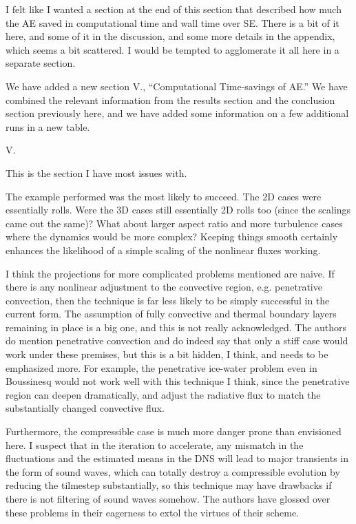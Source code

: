 \documentclass[aps, 11pt, singlecolumn]{revtex4-1} %
\begin{document}
\begin{singlespace}
\begin{myquotation}
I felt like I wanted a section at the end of this section that
described how much the AE saved in computational time and wall time
over SE. There is a bit of it here, and some of it in the discussion,
and some more details in the appendix, which seems a bit scattered. I
would be tempted to agglomerate it all here in a separate section.
\end{myquotation}
We have added a new section V., ``Computational Time-savings of AE.''
We have combined the relevant information from the results section and the 
conclusion section previously here, and we have added some information on a few
additional runs in a new table. 

\begin{myquotation}
V.

This is the section I have most issues with.

The example performed was the most likely to succeed. The 2D cases
were essentially rolls. Were the 3D cases still essentially 2D rolls
too (since the scalings came out the same)? What about larger aspect
ratio and more turbulence cases where the dynamics would be more
complex? Keeping things smooth certainly enhances the likelihood of a
simple scaling of the nonlinear fluxes working.

I think the projections for more complicated problems mentioned are
naive. If there is any nonlinear adjustment to the convective region,
e.g. penetrative convection, then the technique is far less likely to
be simply successful in the current form. The assumption of fully
convective and thermal boundary layers remaining in place is a big
one, and this is not really acknowledged. The authors do mention
penetrative convection and do indeed say that only a stiff case would
work under these premises, but this is a bit hidden, I think, and
needs to be emphasized more. For example, the penetrative ice-water
problem even in Boussinesq would not work well with this technique I
think, since the penetrative region can deepen dramatically, and
adjust the radiative flux to match the substantially changed
convective flux.

Furthermore, the compressible case is much more danger prone than
envisioned here. I suspect that in the iteration to accelerate, any
mismatch in the fluctuations and the estimated means in the DNS will
lead to major transients in the form of sound waves, which can totally
destroy a compressible evolution by reducing the tilmestep
substantially, so this technique may have drawbacks if there is not
filtering of sound waves somehow. The authors have glossed over these
problems in their eagerness to extol the virtues of their scheme.


\end{myquotation}
\end{singlespace}
\end{document}
